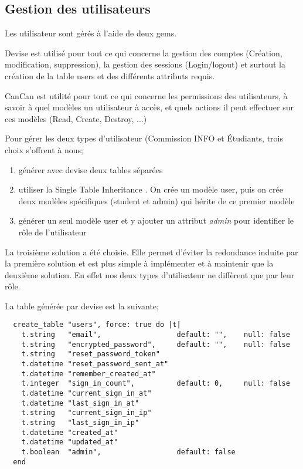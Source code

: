 \subsection{Gestion des utilisateurs}
\label{user_mgmt}
Les utilisateur sont gérés à l'aide de deux gems. 

Devise est utilisé pour tout ce qui concerne la gestion des comptes (Création, modification, suppression), la gestion des sessions (Login/logout) et surtout la création de la table users et des différents attributs requis.

CanCan est utilité pour tout ce qui concerne les permissions des utilisateurs, à savoir à quel modèles un utilisateur à accès, et quels actions il peut effectuer sur ces modèles (Read, Create, Destroy, ...) 

Pour gérer les deux types d'utilisateur (Commission INFO et Étudiants, trois choix s'offrent à nous;
\begin{enumerate}
  \item générer avec devise deux tables séparées
  \item utiliser la Single Table Inheritance \cite{STI}. On crée un modèle user, puis on crée deux modèles spécifiques (student et admin) qui hérite de ce premier modèle
  \item générer un seul modèle user et y ajouter un attribut \textit{admin} pour identifier le rôle de l'utilisateur
\end{enumerate}

La troisième solution a été choisie. Elle permet d'éviter la redondance induite par la première solution et est plus simple à implémenter et à maintenir que la deuxième solution. En effet nos deux types d'utilisateur ne diffèrent que par leur rôle. 


La table générée par devise est la suivante;

\begin{lstlisting}
  create_table "users", force: true do |t|
    t.string   "email",                  default: "",    null: false
    t.string   "encrypted_password",     default: "",    null: false
    t.string   "reset_password_token"
    t.datetime "reset_password_sent_at"
    t.datetime "remember_created_at"
    t.integer  "sign_in_count",          default: 0,     null: false
    t.datetime "current_sign_in_at"
    t.datetime "last_sign_in_at"
    t.string   "current_sign_in_ip"
    t.string   "last_sign_in_ip"
    t.datetime "created_at"
    t.datetime "updated_at"
    t.boolean  "admin",                  default: false
  end
\end{lstlisting}

